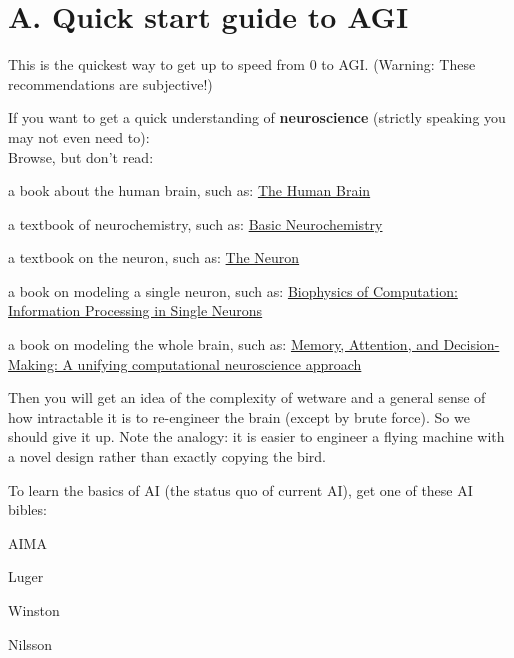 \chapter*{A. Quick start guide to AGI}

This is the quickest way to get up to speed from 0 to AGI.  (Warning: These recommendations are subjective!)

If you want to get a quick understanding of \textbf{neuroscience} (strictly speaking you may not even need to):\\
Browse, but don't read:
\begin{compactenum}[\textbullet ]
\item a book about the human brain, such as: \href{http://www.amazon.com/Human-Brain-Introduction-Functional-Anatomy/dp/0323041310/ref=sr_1_2?ie=UTF8&s=books&qid=1268965281&sr=8-2}
{The Human Brain}
\item a textbook of neurochemistry, such as:
\href{http://www.amazon.com/Basic-Neurochemistry-Seventh-Molecular-Cellular/dp/012088397X/ref=sr_1_1?ie=UTF8&s=books&qid=1268965399&sr=1-1}
{Basic Neurochemistry}
\item a textbook on the neuron, such as:
\href{http://www.amazon.com/Neuron-Cell-Molecular-Biology/dp/0195145232/ref=sr_1_1?ie=UTF8&s=books&qid=1268965470&sr=1-1}
{The Neuron}
\item a book on modeling a single neuron, such as:
\href{http://www.amazon.com/Biophysics-Computation-Information-Computational-Neuroscience/dp/0195181999/ref=sr_1_1?ie=UTF8&s=books&qid=1268967514&sr=1-1}
{Biophysics of Computation: Information Processing in Single Neurons}
\item a book on modeling the whole brain, such as:
\href{http://www.amazon.com/Memory-Attention-Decision-Making-computational-neuroscience/dp/0199232709/ref=ntt_at_ep_dpt_2}
{Memory, Attention, and Decision-Making: A unifying computational neuroscience approach}
\end{compactenum}
Then you will get an idea of the complexity of wetware and a general sense of how intractable it is to re-engineer the brain (except by brute force).  So we should give it up.  Note the analogy:  it is easier to engineer a flying machine with a novel design rather than exactly copying the bird.

\underconst

To learn the basics of AI (the status quo of current AI), get one of these AI bibles:
\begin{compactenum}[\textbullet ]
\item AIMA
\item Luger
\item Winston
\item Nilsson
\end{compactenum}

